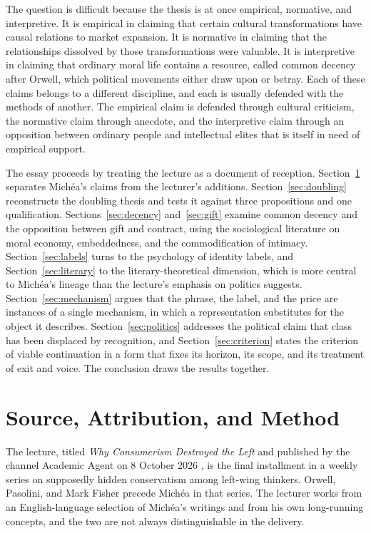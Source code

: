 \documentclass[12pt]{article}
\begin{document}
The question is difficult because the thesis is at once empirical, normative, and interpretive. It is empirical in claiming that certain cultural transformations have causal relations to market expansion. It is normative in claiming that the relationships dissolved by those transformations were valuable. It is interpretive in claiming that ordinary moral life contains a resource, called common decency after Orwell, which political movements either draw upon or betray. Each of these claims belongs to a different discipline, and each is usually defended with the methods of another. The empirical claim is defended through cultural criticism, the normative claim through anecdote, and the interpretive claim through an opposition between ordinary people and intellectual elites that is itself in need of empirical support.

The essay proceeds by treating the lecture as a document of reception. Section~\ref{sec:source} separates Michéa's claims from the lecturer's additions. Section~\ref{sec:doubling} reconstructs the doubling thesis and tests it against three propositions and one qualification. Sections~\ref{sec:decency} and~\ref{sec:gift} examine common decency and the opposition between gift and contract, using the sociological literature on moral economy, embeddedness, and the commodification of intimacy. Section~\ref{sec:labels} turns to the psychology of identity labels, and Section~\ref{sec:literary} to the literary-theoretical dimension, which is more central to Michéa's lineage than the lecture's emphasis on politics suggests. Section~\ref{sec:mechanism} argues that the phrase, the label, and the price are instances of a single mechanism, in which a representation substitutes for the object it describes. Section~\ref{sec:politics} addresses the political claim that class has been displaced by recognition, and Section~\ref{sec:criterion} states the criterion of viable continuation in a form that fixes its horizon, its scope, and its treatment of exit and voice. The conclusion draws the results together.

\section{Source, Attribution, and Method}
\label{sec:source}

The lecture, titled \emph{Why Consumerism Destroyed the Left} and published by the channel Academic Agent on 8 October 2026 \citep{academicagent}, is the final installment in a weekly series on supposedly hidden conservatism among left-wing thinkers. Orwell, Pasolini, and Mark Fisher precede Michéa in that series. The lecturer works from an English-language selection of Michéa's writings and from his own long-running concepts, and the two are not always distinguishable in the delivery.
\end{document}
